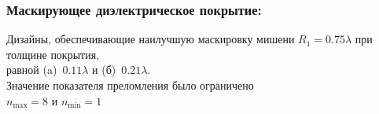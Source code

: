 \documentclass[14pt]{beamer}
\begin{document}
\begin{frame}
  \frametitle{\normalsize Маскирующее диэлектрическое покрытие:}
  \small
  \begin{center}
  \hfill
  \begin{minipage}[ht]{0.48\linewidth}
  \end{minipage}
  \hfill
  \begin{minipage}[ht]{0.48\linewidth}
  \end{minipage}
 Дизайны, обеспечивающие наилучшую маскировку мишени ${R_1 =
  0.75\lambda}$ при
    толщине покрытия,\\ равной (a)~$0.11\lambda$ и
    (б)~$0.21\lambda$.\\  Значение показателя преломления
    было ограничено\\ $n_{\mathrm{max}}=8$ и $n_{\mathrm{min}}=1$ 
\end{center}
\end{frame}
\end{document}

